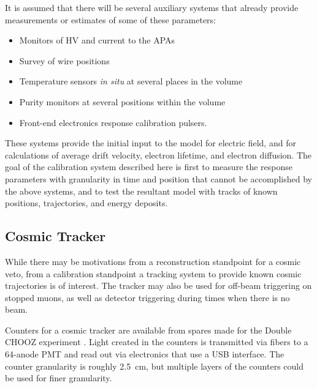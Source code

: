 It is assumed that there will be
several auxiliary systems that already provide measurements or estimates of
some of these parameters:
\begin{itemize}
\item Monitors of HV and current to the APAs 
\item Survey of wire positions 
\item Temperature sensors {\it in situ} at several places in the volume
\item Purity monitors at several positions within the volume
\item Front-end electronics response calibration pulsers.
\end{itemize}
        These systems provide the initial input to the model for electric
field, and for calculations of average drift velocity, electron lifetime, and
electron diffusion.  The goal of the calibration system described here 
is first to measure the response parameters with granularity in time and
position that cannot be accomplished by the above systems, and to test the
resultant model with tracks of known positions, trajectories, and energy
deposits.

\subsection{Cosmic Tracker}

        While there may be motivations from a reconstruction standpoint for a
cosmic veto, from a calibration standpoint a tracking system to provide known 
cosmic trajectories is of interest. The tracker may also be used for
off-beam triggering on stopped muons, as well as detector triggering during
times when there is no beam.

        Counters for a cosmic tracker are available from spares made for the
Double CHOOZ experiment \cite{mucounters}. Light created in the
counters is transmitted via fibers to a 64-anode PMT and read out via
electronics that use a USB interface.  The counter granularity is roughly 2.5~cm, but
multiple layers of the counters could be used for finer granularity.


